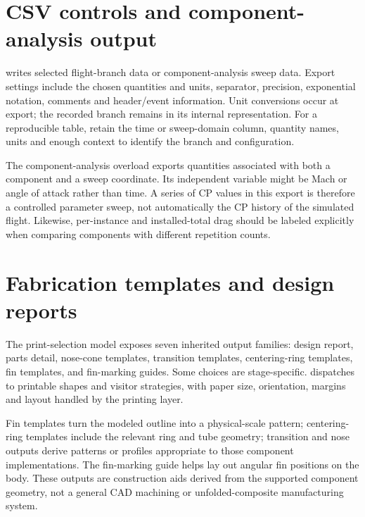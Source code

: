 
\section{CSV controls and component-analysis output}
 writes selected flight-branch data or component-analysis sweep data. Export settings include the chosen quantities and units, separator, precision, exponential notation, comments and header/event information. Unit conversions occur at export; the recorded branch remains in its internal representation. For a reproducible table, retain the time or sweep-domain column, quantity names, units and enough context to identify the branch and configuration.

The component-analysis overload exports quantities associated with both a component and a sweep coordinate. Its independent variable might be Mach or angle of attack rather than time. A series of CP values in this export is therefore a controlled parameter sweep, not automatically the CP history of the simulated flight. Likewise, per-instance and installed-total drag should be labeled explicitly when comparing components with different repetition counts.


\section{Fabrication templates and design reports}
The print-selection model exposes seven inherited output families: design report, parts detail, nose-cone templates, transition templates, centering-ring templates, fin templates, and fin-marking guides. Some choices are stage-specific.  dispatches to printable shapes and visitor strategies, with paper size, orientation, margins and layout handled by the printing layer.

Fin templates turn the modeled outline into a physical-scale pattern; centering-ring templates include the relevant ring and tube geometry; transition and nose outputs derive patterns or profiles appropriate to those component implementations. The fin-marking guide helps lay out angular fin positions on the body. These outputs are construction aids derived from the supported component geometry, not a general CAD machining or unfolded-composite manufacturing system.

